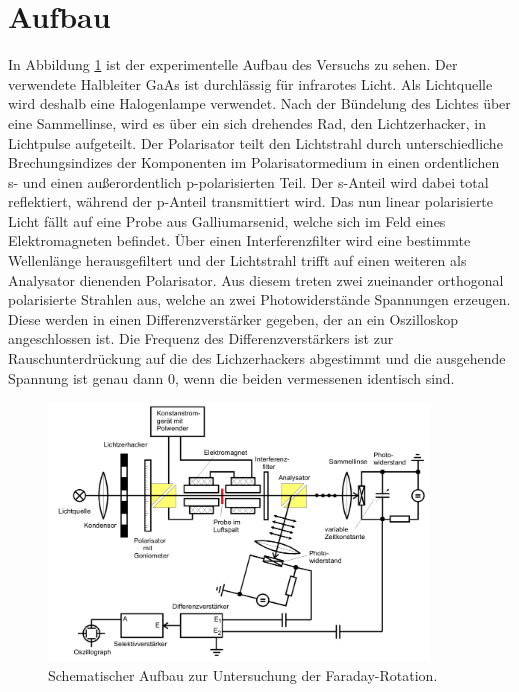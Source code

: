 \section{Aufbau}
\label{sec:Aufbau}

In Abbildung \ref{fig:Aufbau} ist der experimentelle Aufbau des Versuchs zu sehen.
Der verwendete Halbleiter GaAs ist durchlässig für infrarotes Licht.
Als Lichtquelle wird deshalb eine Halogenlampe verwendet.
Nach der Bündelung des Lichtes über eine Sammellinse, wird es über ein sich drehendes Rad, den Lichtzerhacker, in Lichtpulse aufgeteilt.
Der Polarisator teilt den Lichtstrahl durch unterschiedliche Brechungsindizes der Komponenten im Polarisatormedium in einen ordentlichen s- und einen außerordentlich p-polarisierten Teil. Der s-Anteil wird dabei total reflektiert, während der p-Anteil transmittiert wird.
Das nun linear polarisierte Licht fällt auf eine Probe aus Galliumarsenid, welche sich im Feld eines Elektromagneten befindet. Über einen Interferenzfilter wird eine bestimmte Wellenlänge herausgefiltert und der Lichtstrahl trifft auf einen weiteren als Analysator dienenden Polarisator. Aus diesem treten zwei zueinander orthogonal polarisierte Strahlen aus, welche an zwei Photowiderstände Spannungen erzeugen.
Diese werden in einen Differenzverstärker gegeben, der an ein Oszilloskop angeschlossen ist. Die Frequenz des Differenzverstärkers ist zur Rauschunterdrückung auf die des Lichzerhackers abgestimmt und die ausgehende Spannung ist genau dann $0$, wenn die beiden vermessenen identisch sind.

\begin{figure}
\centering
\includegraphics[width=0.9\textwidth]{content/images/aufbau.png}
\caption{Schematischer Aufbau zur Untersuchung der Faraday-Rotation.\cite{V46}}
\label{fig:Aufbau}
\end{figure}